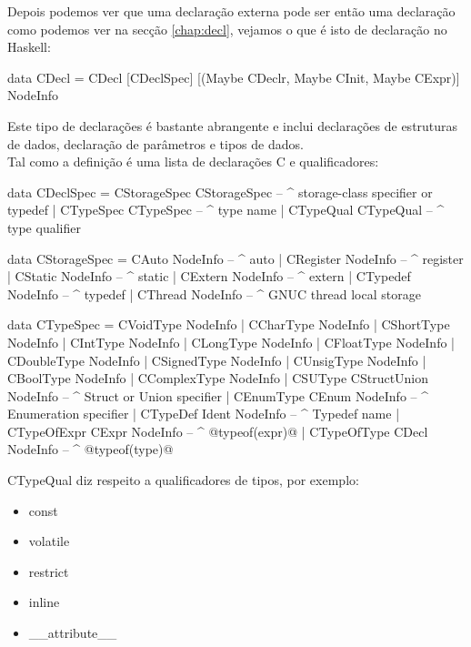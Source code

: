 Depois podemos ver que uma declaração externa pode ser então uma declaração como podemos ver na secção \ref{chap:decl}, vejamos o que é isto de declaração no \textrm{Haskell}:
\begin{haskell}
data CDecl = CDecl [CDeclSpec] [(Maybe CDeclr, Maybe CInit, Maybe CExpr)] NodeInfo
\end{haskell}
Este tipo de declarações é bastante abrangente e inclui declarações de estruturas de dados, declaração de parâmetros e tipos de dados.\\

Tal como  a definição é uma lista de declarações C e qualificadores:
\begin{haskell}
data CDeclSpec = CStorageSpec CStorageSpec  -- ^ storage-class specifier or typedef
               | CTypeSpec    CTypeSpec     -- ^ type name
               | CTypeQual    CTypeQual     -- ^ type qualifier

data CStorageSpec = CAuto     NodeInfo     -- ^ auto
                  | CRegister NodeInfo     -- ^ register
                  | CStatic   NodeInfo     -- ^ static
                  | CExtern   NodeInfo     -- ^ extern
                  | CTypedef  NodeInfo     -- ^ typedef
                  | CThread   NodeInfo     -- ^ GNUC thread local storage

data CTypeSpec = CVoidType    NodeInfo
               | CCharType    NodeInfo
               | CShortType   NodeInfo
               | CIntType     NodeInfo
               | CLongType    NodeInfo
               | CFloatType   NodeInfo
               | CDoubleType  NodeInfo
               | CSignedType  NodeInfo
               | CUnsigType   NodeInfo
               | CBoolType    NodeInfo
               | CComplexType NodeInfo
               | CSUType      CStructUnion NodeInfo  -- ^ Struct or Union specifier
               | CEnumType    CEnum        NodeInfo  -- ^ Enumeration specifier
               | CTypeDef     Ident        NodeInfo  -- ^ Typedef name
               | CTypeOfExpr  CExpr        NodeInfo  -- ^ @typeof(expr)@
               | CTypeOfType  CDecl        NodeInfo  -- ^ @typeof(type)@
\end{haskell}

\textrm{CTypeQual} diz respeito a qualificadores de tipos, por exemplo:
\begin{itemize}
\item const
\item volatile
\item restrict
\item inline
\item \_\_attribute\_\_
\end{itemize}

